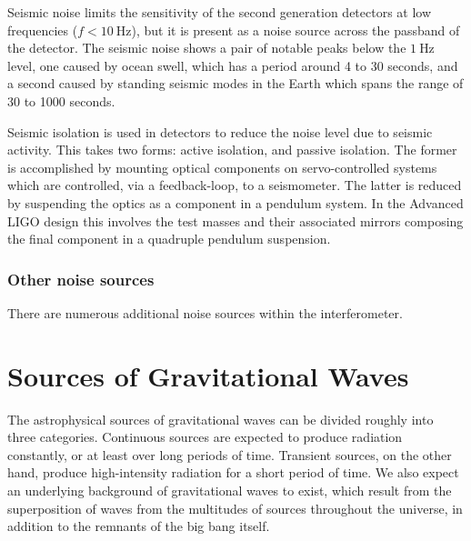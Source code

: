 \documentclass{kentigern}
\begin{document}

Seismic noise limits the sensitivity of the second generation
detectors at low frequencies ($f < \SI{10}{\hertz}$), but it is
present as a noise source across the passband of the detector. The
seismic noise shows a pair of notable peaks below the $\SI{1}{\hertz}$
level, one caused by ocean swell, which has a period around 4 to 30
seconds, and a second caused by standing seismic modes in the Earth
which spans the range of 30 to 1000 seconds.

Seismic isolation is used in detectors to reduce the noise level due
to seismic activity. This takes two forms: active isolation, and
passive isolation. The former is accomplished by mounting optical
components on servo-controlled systems which are controlled, via a
feedback-loop, to a seismometer. The latter is reduced by suspending
the optics as a component in a pendulum system. In the Advanced LIGO
design this involves the test masses and their associated mirrors
composing the final component in a quadruple pendulum suspension.



\subsection{Other noise sources}
\label{sec:other-noise-sources}

There are numerous additional noise sources within the interferometer.

\chapter{Sources of Gravitational Waves}
\label{cha:sourc-grav-waves}


The astrophysical sources of gravitational waves can be divided
roughly into three categories\cite{2009LRR....12....2S}. Continuous
sources are expected to produce radiation constantly, or at least over
long periods of time. Transient sources, on the other hand, produce
high-intensity radiation for a short period of time. We also expect an
underlying background of gravitational waves to exist, which result
from the superposition of waves from the multitudes of sources
throughout the universe, in addition to the remnants of the big bang
itself.
\end{document}
